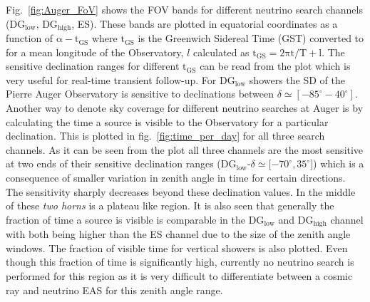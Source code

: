 Fig.~\ref{fig:Auger_FoV} shows the FOV bands for different neutrino search channels (DG$\mathrm{_{\text{low}}}$, DG$\mathrm{_{\text{high}}}$, ES). These bands are plotted in equatorial coordinates as a function of $\mathrm{\alpha - t _{GS}}$ where $\mathrm{t_{GS}}$ is the Greenwich Sidereal Time (GST) converted to for a mean longitude of the Observatory, $l$ calculated as $\mathrm{t_{GS}= 2\pi t/T + l}$. The sensitive declination ranges for different $\mathrm{t_{GS}}$ can be read from the plot which is very useful for real-time transient follow-up. For DG$\mathrm{_{\text{low}}}$ showers the SD of the Pierre Auger Observatory is sensitive to declinations between $\delta \simeq [-85^{\circ} - 40^{\circ}]$. Another way to denote sky coverage for different neutrino searches at Auger is by calculating the time a source is visible to the Observatory for a particular declination. This is plotted in fig.~\ref{fig:time_per_day} for all three search channels. As it can be seen from the plot all three channels are the most sensitive at two ends of their sensitive declination ranges (DG$\mathrm{_{\text{low}}}$-$\delta \simeq [-70^{\circ}, 35^{\circ}$]) which is a consequence of smaller variation in zenith angle in time for certain directions. The sensitivity sharply decreases beyond these declination values. In the middle of these \textit{two horns} is a plateau like region. It is also seen that generally the fraction of time a source is visible is comparable in the DG$\mathrm{_{\text{low}}}$ and DG$\mathrm{_{\text{high}}}$ channel with both being higher than the ES channel due to the size of the zenith angle windows. The fraction of visible time for vertical showers is also plotted. Even though this fraction of time is significantly high, currently no neutrino search is performed for this region as it is very difficult to differentiate between a cosmic ray and neutrino EAS for this zenith angle range.


